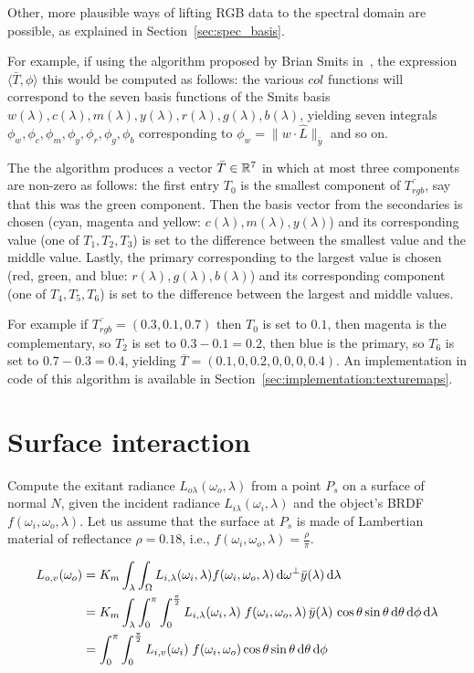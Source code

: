 Other, more plausible ways of lifting \gls{RGB} data to the spectral domain
are possible, as explained in Section~\ref{sec:spec_basis}.

For example, if using the algorithm proposed by Brian Smits in~\cite{smits99},
the expression $\langle \bar T, \phi \rangle$ this would be computed as follows:
the various $col$ functions will correspond to the seven basis functions of the
Smits basis $w(λ), c(λ), m(λ), y(λ), r(λ), g(λ), b(λ)$, yielding seven integrals
$\phi_w, \phi_c, \phi_m, \phi_y, \phi_r, \phi_g, \phi_b$ corresponding to
$\phi_w =  \|w\cdot\hat{L}\|_{\bar y}$ and so on.

The the algorithm produces a vector $\bar T \in \mathbb{R}^7$ in which at most three
components are non-zero as follows: the first entry $T_0$ is the smallest component
of $\overline{T_{rgb}}$, say that this was the green component. Then the basis
vector from the secondaries is chosen (cyan, magenta and yellow: $c(\lambda), m(\lambda), y(\lambda)$)
and its corresponding value (one of $T_1, T_2, T_3$) is set to the difference
between the smallest value and the middle value. Lastly, the primary corresponding
to the largest value is chosen (red, green, and blue: $r(\lambda), g(\lambda), b(\lambda)$)
and its corresponding component (one of $T_4, T_5, T_6$) is set to the difference
between the largest and middle values.

For example if $\overline{T_{rgb}} = (0.3, 0.1, 0.7)$ then $T_0$ is set to $0.1$,
then magenta is the complementary, so $T_2$ is set to $0.3-0.1 = 0.2$, then
blue is the primary, so $T_6$ is set to $0.7 - 0.3 = 0.4$, yielding
$\overline{T} = (0.1, 0, 0.2, 0, 0, 0, 0.4)$. An implementation in code of
this algorithm is available in Section~\ref{sec:implementation:texturemaps}.

\section{Surface interaction}

Compute the exitant radiance $L_{o\lambda}(\omega_o, \lambda)$ from a point
$P_s$ on a surface of normal $N$, given the incident radiance
$L_{i\lambda}(\omega_i, \lambda)$ and the object’s BRDF $f(\omega_i, \omega_o, \lambda)$.
Let us assume that the surface at $P_s$ is made of Lambertian material of reflectance $\rho=0.18$, i.e., $f(\omega_i, \omega_o, \lambda) = \frac \rho \pi$. 

\begin{displaymath}
\begin{split}
    L_{o,v}(\omega_o) &= K_m \int_\lambda \int_\Omega L_{i,\lambda}(\omega_i, \lambda) f(\omega_i, \omega_o, \lambda) \mathop{}\!\mathrm{d} \omega^{\bot} \bar y(\lambda) \mathop{}\!\mathrm{d}\lambda \\
    &= K_m \int_\lambda \int_0^\pi \int_0^{\frac \pi 2}  L_{i,\lambda}(\omega_i, \lambda)\;f(\omega_i, \omega_o, \lambda)\, \bar y(\lambda)\, \cos\theta \sin\theta \mathop{}\!\mathrm{d}\theta \mathop{}\!\mathrm{d}\phi \mathop{}\!\mathrm{d}\lambda \\
    &= \int_0^\pi \int_0^{\frac \pi 2}  L_{i,v}(\omega_i)\;f(\omega_i, \omega_o)\cos\theta \sin\theta \mathop{}\!\mathrm{d}\theta \mathop{}\!\mathrm{d}\phi
\end{split}
\end{displaymath}

